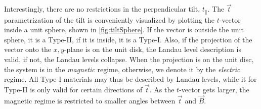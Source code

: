 Interestingly, there are no restrictions in the perpendicular tilt, \( t_\parallel \).
The \( \vec{t} \) parametrization of the tilt is conveniently visualized by plotting the \( t \)-vector inside a unit sphere, shown in \cref{fig:tiltSphere}.
If the vector is outside the unit sphere, it is a Type-II, if it is inside, it is a Type-I.
Also, if the projection of the vector onto the \(x,y\)-plane is on the unit disk, the Landau level description is valid, if not, the Landau levels collapse.
When the projection is on the unit disc, the system is in the \emph{magnetic} regime, otherwise, we denote it by the \emph{electric} regime.
All Type-I materials may thus be described by Landau levels, while it for Type-II is only valid for certain directions of \(\vec{t}\).
As the \(t\)-vector gets larger, the magnetic regime is restricted to smaller angles between \( \vec{t} \) and \( \vec{B} \).
